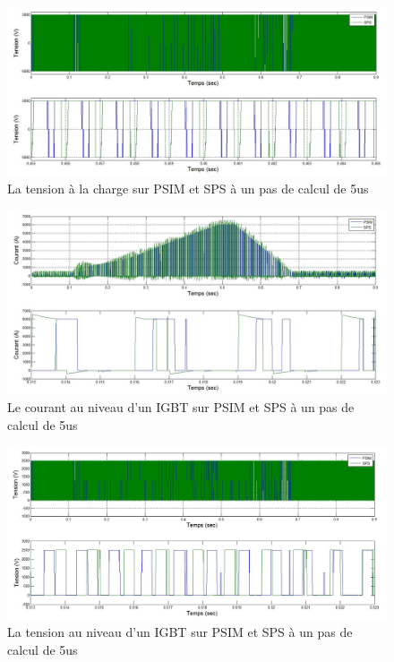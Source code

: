 \documentclass[11pt,letterpaper,final]{report}
\begin{document}
\begin{figure}[h!]
\centering
\includegraphics[scale=0.5]{Fig/DCPDCN/DCPTensionCharge5u.jpg}
\caption{La tension à la charge sur PSIM et SPS à un pas de calcul de 5us}
\label{DC_ch_ten_5}
\end{figure}

\begin{figure}[h!]
\centering
\includegraphics[scale=0.5]{Fig/DCPDCN/DCPCourantIGBT5u.jpg}
\caption{Le courant au niveau d'un IGBT sur PSIM et SPS à un pas de calcul de 5us}
\label{DC_IG_cou_5}
\end{figure}



\begin{figure}[h!]
\centering
\includegraphics[scale=0.5]{Fig/DCPDCN/DCPTensionIGBT5u.jpg}
\caption{La tension au niveau d'un IGBT sur PSIM et SPS à un pas de calcul de 5us}
\label{DC_IG_ten_5}
\end{figure}
\end{document}
